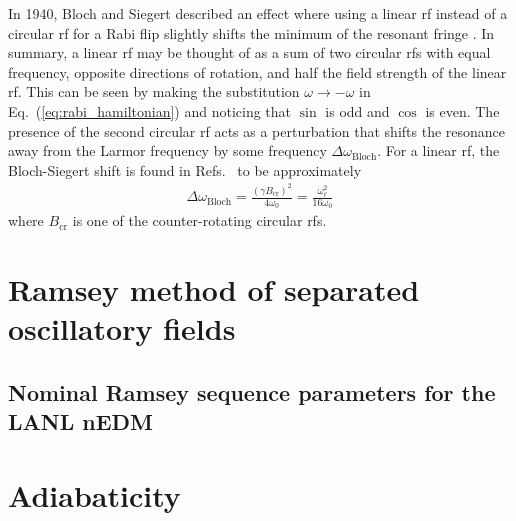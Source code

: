 
In 1940, Bloch and Siegert described an effect where using a linear \acrshort*{rf} instead of a circular \acrshort*{rf} for a Rabi flip slightly shifts the minimum of the resonant fringe \cite{bloch_magnetic_1940}. In summary, a linear \acrshort*{rf} may be thought of as a sum of two circular \acrshort*{rf}s with equal frequency, opposite directions of rotation, and half the field strength of the linear \acrshort*{rf}. This can be seen by making the substitution $\omega \rightarrow -\omega$ in Eq.~(\ref{eq:rabi_hamiltonian}) and noticing that $\sin$ is odd and $\cos$ is even. The presence of the second circular \acrshort*{rf} acts as a perturbation that shifts the resonance away from the Larmor frequency by some frequency $\Delta\omega_\text{Bloch}$. For a linear \acrshort*{rf}, the Bloch-Siegert shift is found in Refs.~\cite{bloch_magnetic_1940, ramsey_resonance_1955} to be approximately
%
\begin{gather}
    \Delta\omega_\text{Bloch}= \frac{(\gamma B_\text{cr})^2}{4\omega_0} = \frac{\omega_\ell^2}{16\omega_0}
\end{gather}
%
where $B_\text{cr}$ is one of the counter-rotating circular \acrshort*{rf}s.



\section{Ramsey method of separated oscillatory fields\label{sec:ramsey-method}}




\subsection{Nominal Ramsey sequence parameters for the LANL nEDM}




\section{Adiabaticity}\label{sec:adiabaticity}


